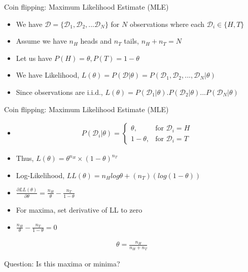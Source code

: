 \documentclass{beamer}
\newcommand{\data}{\mathcal{D}}
\begin{document}
\begin{frame}{Coin flipping: Maximum Likelihood Estimate (MLE)}
\begin{itemize}
	\item We have $\mathcal{D} = \{\data_1, \data_2, ...\data_{N}\}$ for $N$ observations where each $\mathcal{D}_i \in \{H, T\}$
	\item Assume we have $n_H$ heads and $n_T$ tails, $n_H + n_T = N$
	\item Let us have $P(H) = \theta, P(T) = 1-\theta$
	\item We have Likelihood, $L(\theta) = P(\mathcal{D}|\theta) = P(\data_1, \data_2, ..., \data_N|\theta)$
	\item Since observations are i.i.d., $L(\theta) = P(\data_1|\theta).P(\data_2|\theta) ... P(\data_N|\theta)$
\end{itemize}

\end{frame}


\begin{frame}{Coin flipping: Maximum Likelihood Estimate (MLE)}
\begin{itemize}
	\item  
\begin{align*}  
P(\data_i|\theta) =  \left
\{\begin{array}{lr} \theta, & \text{for~} \data_i =H \\
1-\theta, & \text{for~} \data_i = T
\end{array}\right.\
\end{align*}  
\item Thus, $L(\theta) = \theta^{n_H}\times (1-\theta)^{n_T}$
\item Log-Likelihood, $LL(\theta) = n_Hlog\theta + (n_T)(log(1-\theta))$
\item $\frac{\partial LL(\theta)}{\partial \theta} = \frac{n_H}{\theta} - \frac{n_T}{1-\theta}$
\item  For maxima, set derivative of LL to zero

\item 	$\frac{n_H}{\theta} - \frac{n_T}{1-\theta} = 0 $
\end{itemize}
\begin{tcolorbox}
	\begin{align*}
	 \theta = \frac{n_H}{n_H + n_T}
	\end{align*}

\end{tcolorbox}
Question: Is this maxima or minima?

\end{frame}
\end{document}
